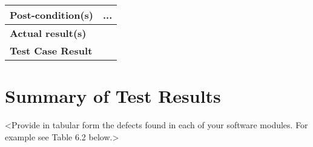 \begin{table}[htb]
\begin{tabular}{|l|l|}
\textbf{Post-condition(s)}      & ...                                                                                                                                                                                                    \\ \hline
\textbf{Actual result(s)}       &                                                                                                                                                                                                        \\ \hline
\textbf{Test Case Result}       &                                                                                                                                                                                                        \\ \hline
\end{tabular}
\label{tbl:table41}
\end{table}


\section{Summary of Test Results}
<Provide in tabular form the defects found in each of your software modules. For example see Table 6.2 below.>

